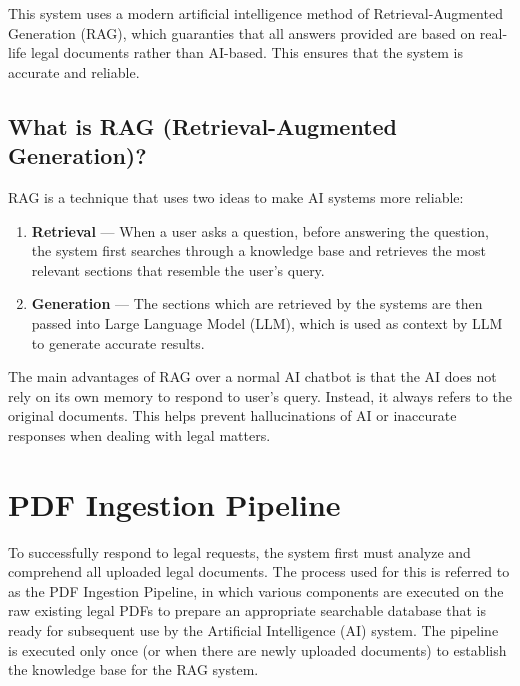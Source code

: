 \documentclass[12pt,a4paper]{article}
\begin{document}
This system uses a modern artificial intelligence method of Retrieval-Augmented Generation (RAG), which guaranties that all answers provided are based on real-life legal documents rather than AI-based. This ensures that the system is accurate and reliable.

\subsection{What is RAG (Retrieval-Augmented Generation)?}

RAG is a technique that uses two ideas to make AI systems more reliable: 

\begin{enumerate}
  \item \textbf{Retrieval} --- When a user asks a question, before answering the question, the system first searches through a knowledge base and retrieves the most relevant sections that resemble the user's query.
  \item \textbf{Generation} --- The sections which are retrieved by the systems are then passed into Large Language Model (LLM), which is used as context by LLM to generate accurate results.
\end{enumerate}

The main advantages of RAG over a normal AI chatbot is that the AI does not rely on its own memory to respond to user's query. Instead, it always refers to the original documents. This helps prevent hallucinations of AI or inaccurate responses when dealing with legal matters.



\section{PDF Ingestion Pipeline}

To successfully respond to legal requests, the system first must analyze and comprehend all uploaded legal documents. The process used for this is referred to as the PDF Ingestion Pipeline, in which various components are executed on the raw existing legal PDFs to prepare an appropriate searchable database that is ready for subsequent use by the Artificial Intelligence (AI) system. The pipeline is executed only once (or when there are newly uploaded documents) to establish the knowledge base for the RAG system.
\end{document}
